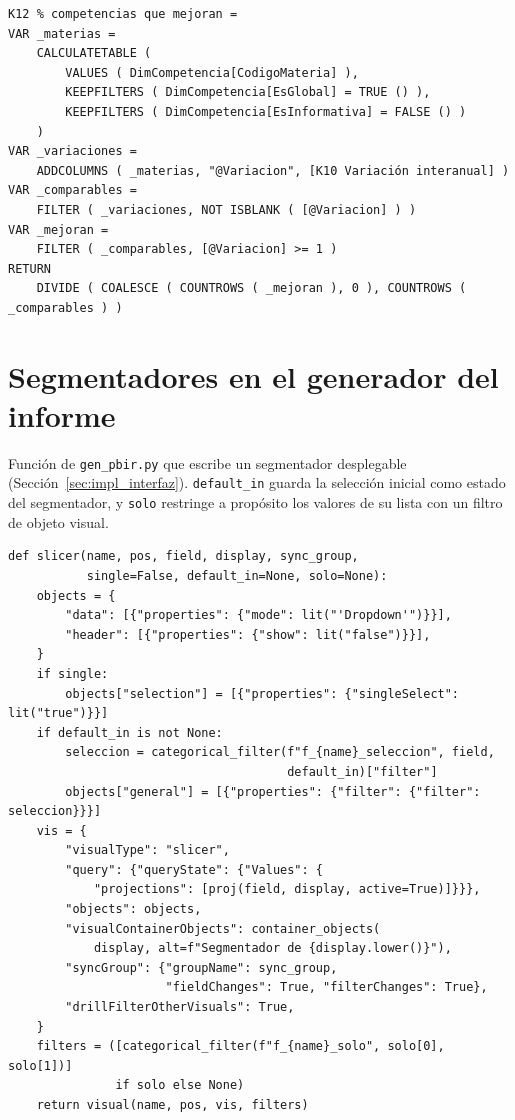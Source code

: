 \documentclass[12pt, a4paper, oneside]{report}
\begin{document}
\begingroup\footnotesize{}
\begin{verbatim}
K12 % competencias que mejoran =
VAR _materias =
    CALCULATETABLE (
        VALUES ( DimCompetencia[CodigoMateria] ),
        KEEPFILTERS ( DimCompetencia[EsGlobal] = TRUE () ),
        KEEPFILTERS ( DimCompetencia[EsInformativa] = FALSE () )
    )
VAR _variaciones =
    ADDCOLUMNS ( _materias, "@Variacion", [K10 Variación interanual] )
VAR _comparables =
    FILTER ( _variaciones, NOT ISBLANK ( [@Variacion] ) )
VAR _mejoran =
    FILTER ( _comparables, [@Variacion] >= 1 )
RETURN
    DIVIDE ( COALESCE ( COUNTROWS ( _mejoran ), 0 ), COUNTROWS ( _comparables ) )
\end{verbatim}
\endgroup

\section{Segmentadores en el generador del informe}
Función de \texttt{gen\_pbir.py} que escribe un segmentador desplegable (Sección~\ref{sec:impl_interfaz}). \texttt{default\_in} guarda la selección inicial como estado del segmentador, y \texttt{solo} restringe a propósito los valores de su lista con un filtro de objeto visual.

\begingroup\footnotesize{}
\begin{verbatim}
def slicer(name, pos, field, display, sync_group,
           single=False, default_in=None, solo=None):
    objects = {
        "data": [{"properties": {"mode": lit("'Dropdown'")}}],
        "header": [{"properties": {"show": lit("false")}}],
    }
    if single:
        objects["selection"] = [{"properties": {"singleSelect": lit("true")}}]
    if default_in is not None:
        seleccion = categorical_filter(f"f_{name}_seleccion", field,
                                       default_in)["filter"]
        objects["general"] = [{"properties": {"filter": {"filter": seleccion}}}]
    vis = {
        "visualType": "slicer",
        "query": {"queryState": {"Values": {
            "projections": [proj(field, display, active=True)]}}},
        "objects": objects,
        "visualContainerObjects": container_objects(
            display, alt=f"Segmentador de {display.lower()}"),
        "syncGroup": {"groupName": sync_group,
                      "fieldChanges": True, "filterChanges": True},
        "drillFilterOtherVisuals": True,
    }
    filters = ([categorical_filter(f"f_{name}_solo", solo[0], solo[1])]
               if solo else None)
    return visual(name, pos, vis, filters)
\end{verbatim}
\endgroup
\end{document}
